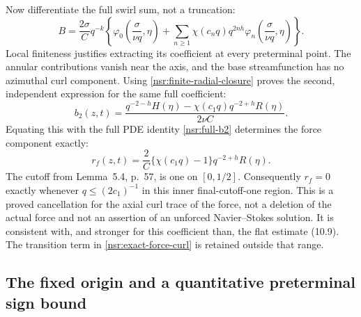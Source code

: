 Now differentiate the full swirl sum, not a truncation:
\[
 B=\frac{2\sigma}{C}q^{-k}
 \left\{\varphi_0\left(\frac{\sigma}{\nu q},\eta\right)
       +\sum_{n\geq1}\chi(c_nq)q^{2nh}
          \varphi_n\left(\frac{\sigma}{\nu q},\eta\right)\right\}.
\]
Local finiteness justifies extracting its coefficient at every
preterminal point. The annular contributions vanish near the axis,
and the base streamfunction has no azimuthal curl component.
Using \eqref{nsr:finite-radial-closure} proves the second, independent
expression for the same full coefficient:
\begin{equation}\label{nsr:cutoff-b2}
 \boxed{\quad b_2(z,t)=\frac{q^{-2-h}H(\eta)
                   -\chi(c_1q)q^{-2+h}R(\eta)}{2\nu C}.\quad}
\end{equation}
Equating this with the full PDE identity \eqref{nsr:full-b2}
determines the force component exactly:
\begin{equation}\label{nsr:exact-force-curl}
 r_f(z,t)=\frac2C\{\chi(c_1q)-1\}q^{-2+h}R(\eta).
\end{equation}
The cutoff from Lemma~5.4, p.~57, is one on \([0,1/2]\).
Consequently \(r_f=0\) exactly whenever \(q\leq(2c_1)^{-1}\)
in this inner final-cutoff-one region. This is a proved cancellation
for the axial curl trace of the force, not a deletion of the actual
force and not an assertion of an unforced Navier--Stokes solution.
It is consistent with, and stronger for this coefficient than, the
flat estimate (10.9). The transition term in
\eqref{nsr:exact-force-curl} is retained outside that range.

\subsection{The fixed origin and a quantitative preterminal sign bound}

